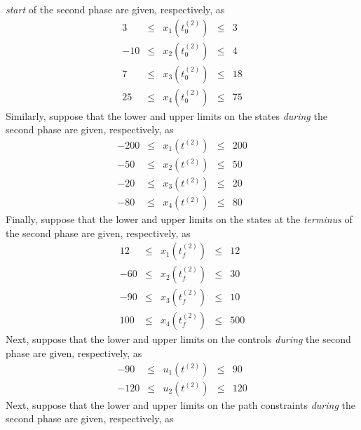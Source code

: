 \documentclass[10pt,final]{report}
\newenvironment{shadedframe}{%
  \def\FrameCommand{\fcolorbox{black}{shadecolor}}%
  \MakeFramed {\FrameRestore}}
{\endMakeFramed}
\begin{document}
\begin{shadedframe}
{\em start} of the second phase are given, respectively, as
\begin{displaymath}
  \begin{array}{rcccr}
     3 & \leq & x_1(t_0^{(2)}) & \leq & 3 \\
    -10 & \leq & x_2(t_0^{(2)}) & \leq & 4 \\
    7 & \leq & x_3(t_0^{(2)}) & \leq & 18 \\
   25 & \leq & x_4(t_0^{(2)}) & \leq & 75
  \end{array}
\end{displaymath}
Similarly, suppose that the lower and upper limits on the states
{\em during} the second phase are given, respectively, as
\begin{displaymath}
  \begin{array}{rcccr}
    -200 & \leq & x_1(t^{(2)}) & \leq & 200 \\
    -50 & \leq & x_2(t^{(2)}) & \leq & 50 \\
    -20 & \leq & x_3(t^{(2)}) & \leq & 20 \\
    -80 & \leq & x_4(t^{(2)}) & \leq & 80
  \end{array}
\end{displaymath}
Finally, suppose that the lower and upper limits on the states at the
{\em terminus} of the second phase are given, respectively, as
\begin{displaymath}
  \begin{array}{rcccr}
    12 & \leq & x_1(t_f^{(2)}) & \leq & 12 \\
    -60 & \leq & x_2(t_f^{(2)}) & \leq & 30 \\
    -90 & \leq & x_3(t_f^{(2)}) & \leq & 10 \\
   100 & \leq & x_4(t_f^{(2)}) & \leq & 500
  \end{array}
\end{displaymath}
Next, suppose that the lower and upper limits on the controls
{\em during} the second phase are given, respectively, as
\begin{displaymath}
  \begin{array}{rcccr}
    -90 & \leq & u_1(t^{(2)}) & \leq & 90 \\
    -120 & \leq & u_2(t^{(2)})& \leq & 120
  \end{array}
\end{displaymath}
Next, suppose that the lower and upper limits on the path constraints
{\em during} the second phase are given, respectively, as
\begin{displaymath}
  \begin{array}{rcccr}

\end{array}
\end{displaymath}
\end{shadedframe}
\end{document}
